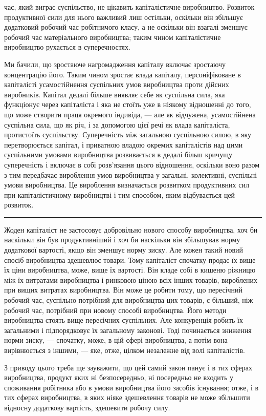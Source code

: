 \parcont{}  %
час, який виграє суспільство, не цікавить капіталістичне виробництво.
Розвиток продуктивної сили для нього важливий лиш
остільки, оскільки він збільшує додатковий робочий час робітничого
класу, а не оскільки він взагалі зменшує робочий час
матеріального виробництва; таким чином капіталістичне виробництво
рухається в суперечностях.

Ми бачили, що зростаюче нагромадження капіталу включає
зростаючу концентрацію його. Таким чином зростає влада капіталу,
персоніфіковане в капіталісті усамостійнення суспільних
умов виробництва проти дійсних виробників. Капітал дедалі більше
виявляє себе як суспільна сила, яка функціонує через капіталіста
і яка не стоїть уже в ніякому відношенні до того, що
може створити праця окремого індивіда, — але як відчужена,
усамостійнена суспільна сила, що як річ, і за допомогою цієї
речі як влада капіталіста, протистоїть суспільству. Суперечність
між загальною суспільною силою, в яку перетворюється капітал,
і приватною владою окремих капіталістів над цими суспільними
умовами виробництва розвивається в дедалі більш кричущу суперечність
і включає в собі розв’язання цього відношення,
оскільки воно разом з тим передбачає вироблення умов виробництва
у загальні, колективні, суспільні умови виробництва.
Це вироблення визначається розвитком продуктивних сил при
капіталістичному виробництві і тим способом, яким відбувається
цей розвиток.

\pfbreak{}

Жоден капіталіст не застосовує добровільно нового способу
виробництва, хоч би наскільки він був продуктивніший і хоч би
наскільки він збільшував норму додаткової вартості, якщо він
зменшує норму зиску. Але кожен такий новий спосіб виробництва
здешевлює товари. Тому капіталіст спочатку продає
їх вище їх ціни виробництва, може, вище їх вартості. Він кладе
собі в кишеню ріжницю між їх витратами виробництва і ринковою
ціною всіх інших товарів, вироблених при вищих витратах
виробництва. Він може це робити тому, що пересічний робочий
час, суспільно потрібний для виробництва цих товарів, є більший,
ніж робочий час, потрібний при новому способі виробництва.
Його методи виробництва стоять вище пересічних суспільних.
Але конкуренція робить їх загальними і підпорядковує їх загальному
законові. Тоді починається зниження норми зиску, — спочатку,
може, в цій сфері виробництва, а потім вона вирівнюється
з іншими, — яке, отже, цілком незалежне від волі капіталістів.

З приводу цього треба ще зауважити, що цей самий закон
панує і в тих сферах виробництва, продукт яких ні безпосередньо,
ні посередньо не входить у споживання робітника або
в умови виробництва його засобів існування; отже, і в тих сферах
виробництва, в яких ніяке здешевлення товарів не може збільшити
відносну додаткову вартість, здешевити робочу силу.
\parbreak{}  %
